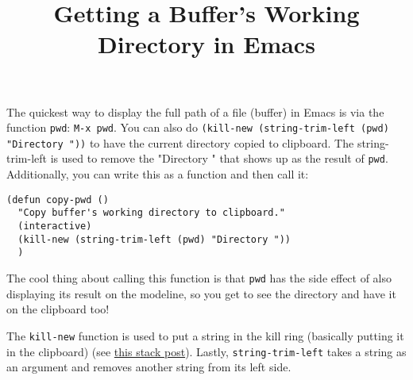 \documentclass[12pt, a4paper]{article}
\date{}
\title{Getting a Buffer's Working Directory in Emacs}
\begin{document}
\maketitle
The quickest way to display the full path of a file (buffer) in Emacs is via the function \texttt{pwd}: \texttt{M-x pwd}.
You can also do \texttt{(kill-new (string-trim-left (pwd) "Directory "))} to have the current directory copied to clipboard. The string-trim-left is used to remove the "Directory " that shows up as the result of \texttt{pwd}.
Additionally, you can write this as a function and then call it:
\lstset{language=elisp,label= ,caption= ,captionpos=b,numbers=none}
\begin{lstlisting}
(defun copy-pwd ()
  "Copy buffer's working directory to clipboard."
  (interactive)
  (kill-new (string-trim-left (pwd) "Directory "))
  )
\end{lstlisting}
The cool thing about calling this function is that \texttt{pwd} has the side effect of also displaying its result on the modeline, so you get to see the directory and have it on the clipboard too!

The \texttt{kill-new} function is used to put a string in the kill ring (basically putting it in the clipboard) (see \href{https://stackoverflow.com/questions/2178850/how-to-copy-to-clipboard-in-emacs-lisp}{this stack post}). Lastly, \texttt{string-trim-left} takes a string as an argument and removes another string from its left side.
\end{document}

